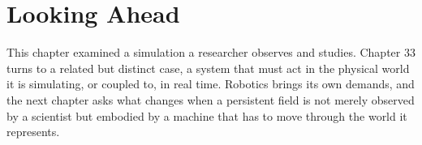 \section{Looking Ahead}

This chapter examined a simulation a researcher observes and studies. Chapter 33 turns to a related but distinct case, a system that must act in the physical world it is simulating, or coupled to, in real time. Robotics brings its own demands, and the next chapter asks what changes when a persistent field is not merely observed by a scientist but embodied by a machine that has to move through the world it represents.

